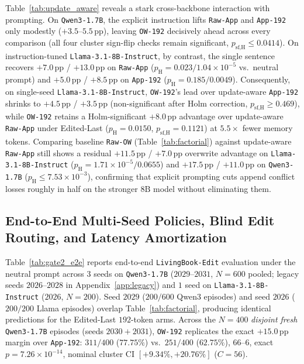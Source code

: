 \documentclass[11pt]{article}
\newcommand{\pp}{\,\text{pp}}
\renewcommand{\_}{\origunderscore\allowbreak}
\begin{document}
Table~\ref{tab:update_aware} reveals a stark cross-backbone interaction with prompting. On \texttt{Qwen3-1.7B}, the explicit instruction lifts \texttt{Raw-App} and \texttt{App-192} only modestly ($+3.5$--$5.5\pp$), leaving \texttt{OW-192} decisively ahead across every comparison (all four cluster sign-flip checks remain significant, $p_{\text{sf,H}} \le 0.0414$). On instruction-tuned \texttt{Llama-3.1-8B-Instruct}, by contrast, the single sentence recovers $+7.0\pp$ / $+13.0\pp$ on \texttt{Raw-App} ($p_{\text{H}} = 0.023 / 1.04\times 10^{-5}$ vs.\ neutral prompt) and $+5.0\pp$ / $+8.5\pp$ on \texttt{App-192} ($p_{\text{H}} = 0.185 / 0.0049$). Consequently, on single-seed \texttt{Llama-3.1-8B-Instruct}, \texttt{OW-192}'s lead over update-aware \texttt{App-192} shrinks to $+4.5\pp$ / $+3.5\pp$ (non-significant after Holm correction, $p_{\text{sf,H}} \ge 0.469$), while \texttt{OW-192} retains a Holm-significant $+8.0\pp$ advantage over update-aware \texttt{Raw-App} under Edited-Last ($p_{\text{H}}=0.0150$, $p_{\text{sf,H}}=0.1121$) at $5.5\times$ fewer memory tokens. Comparing baseline \texttt{Raw-OW} (Table~\ref{tab:factorial}) against update-aware \texttt{Raw-App} still shows a residual $+11.5\pp$ / $+7.0\pp$ overwrite advantage on \texttt{Llama-3.1-8B-Instruct} ($p_{\text{H}} = 1.71\times 10^{-5} / 0.0655$) and $+17.5\pp$ / $+11.0\pp$ on \texttt{Qwen3-1.7B} ($p_{\text{H}} \le 7.53\times 10^{-3}$), confirming that explicit prompting cuts append conflict losses roughly in half on the stronger $8\text{B}$ model without eliminating them.

\subsection{End-to-End Multi-Seed Policies, Blind Edit Routing, and Latency Amortization}
\label{sec:gate2_e2e}
Table~\ref{tab:gate2_e2e} reports end-to-end \texttt{LivingBook-Edit} evaluation under the neutral prompt across $3$ seeds on \texttt{Qwen3-1.7B} ($2029$--$2031$, $N=600$ pooled; legacy seeds $2026$--$2028$ in Appendix~\ref{app:legacy}) and $1$ seed on \texttt{Llama-3.1-8B-Instruct} ($2026$, $N=200$). Seed $2029$ ($200/600$ Qwen3 episodes) and seed $2026$ ($200/200$ Llama episodes) overlap Table~\ref{tab:factorial}, producing identical predictions for the Edited-Last $192$-token arms. Across the $N=400$ \emph{disjoint fresh} \texttt{Qwen3-1.7B} episodes (seeds $2030 + 2031$), \texttt{OW-192} replicates the exact $+15.0\pp$ margin over \texttt{App-192}: $311/400$ ($77.75\%$) vs.\ $251/400$ ($62.75\%$), $66$--$6$, exact $p=7.26\times 10^{-14}$, nominal cluster CI $[+9.34\%, +20.76\%]$ ($C=56$).
\end{document}
